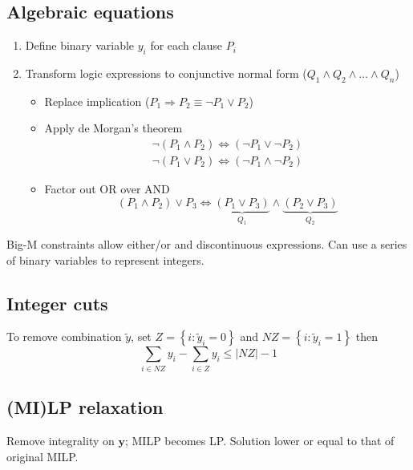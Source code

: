 \documentclass[a4paper,twocolumn,10pt]{article}
\begin{document}
\subsection{Algebraic equations}
\begin{enumerate}
    \item Define binary variable $y_i$ for each clause $P_i$
    \item Transform logic expressions to conjunctive normal form ($Q_1 \wedge Q_2 \wedge \ldots \wedge Q_n$)
        \begin{itemize}
            \item Replace implication ($P_{1} \Rightarrow P_{2} \equiv \neg P_1 \vee P_2$)
            \item Apply de Morgan's theorem
                \begin{equation}
                    \begin{array}{l}
                    \neg\left(P_{1} \wedge P_{2}\right) \Leftrightarrow\left(\neg P_{1} \vee \neg P_{2}\right) \\
                    \neg\left(P_{1} \vee P_{2}\right) \Leftrightarrow\left(\neg P_{1} \wedge \neg P_{2}\right)
                    \end{array}
                \end{equation}
            \item Factor out OR over AND
                \begin{equation}
                    \left(P_{1} \wedge P_{2}\right) \vee P_{3} \Leftrightarrow \underbrace{\left(P_{1} \vee P_{3}\right)}_{Q_{1}} \wedge \underbrace{\left(P_{2} \vee P_{3}\right)}_{Q_{2}}
                \end{equation}
        \end{itemize}
\end{enumerate}
Big-M constraints allow either/or and discontinuous expressions.
Can use a series of binary variables to represent integers.
\subsection{Integer cuts}
To remove combination $\tilde{y}$, set $Z=\left\{i: \tilde{y}_{i}=0\right\}$ and $N Z=\left\{i: \tilde{y}_{i}=1\right\}$ then
\begin{equation}
    \sum_{i \in N Z} y_{i}-\sum_{i \in Z} y_{i} \leq|N Z|-1
\end{equation}
\subsection{(MI)LP relaxation}
Remove integrality on $\boldsymbol{y}$; MILP becomes LP. Solution lower or equal to that of original MILP.
\end{document}
